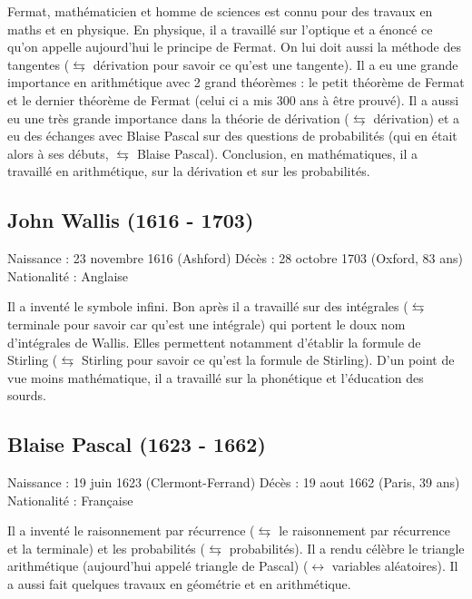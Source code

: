 Fermat, mathématicien et homme de sciences est connu pour des travaux en maths et en physique. En physique, il a travaillé sur l'optique et a énoncé  ce qu'on appelle aujourd'hui le principe de Fermat. On lui doit aussi la méthode des tangentes ($\leftrightarrows$ dérivation pour savoir ce qu'est une tangente). Il a eu une grande importance en arithmétique avec 2 grand théorèmes : le petit théorème de Fermat et le dernier théorème de Fermat (celui ci a mis 300 ans à être prouvé). Il a aussi eu une très grande importance dans la théorie de dérivation ($\leftrightarrows$ dérivation) et a eu des échanges avec Blaise Pascal sur des questions de probabilités (qui en était alors à ses débuts, $\leftrightarrows$ Blaise Pascal). Conclusion, en mathématiques, il a travaillé en arithmétique, sur la dérivation et sur les probabilités. 

\subsection*{John Wallis (1616 - 1703)}
Naissance : 23 novembre 1616 (Ashford)\newline
Décès : 28 octobre 1703 (Oxford, 83 ans)\newline
Nationalité : Anglaise\newline


Il a inventé le symbole infini. Bon après il a travaillé sur des intégrales ($\leftrightarrows$ terminale pour savoir car qu'est une intégrale) qui portent le doux nom d'intégrales de Wallis. Elles permettent notamment d'établir la formule de Stirling ($\leftrightarrows$ Stirling pour savoir ce qu'est la formule de Stirling). 
D'un point de vue moins mathématique, il a travaillé sur la phonétique et l'éducation des sourds.

\subsection*{Blaise Pascal (1623 - 1662)}
Naissance : 19 juin 1623 (Clermont-Ferrand)\newline
Décès : 19 aout 1662 (Paris, 39 ans)\newline
Nationalité : Française\newline

Il a inventé le raisonnement par récurrence ($\leftrightarrows$ le raisonnement par récurrence et la terminale) et les probabilités ($\leftrightarrows$ probabilités). Il a rendu célèbre le triangle arithmétique (aujourd'hui appelé triangle de Pascal) ($\leftrightarrow$ variables aléatoires). Il a aussi fait quelques travaux en géométrie et en arithmétique.



